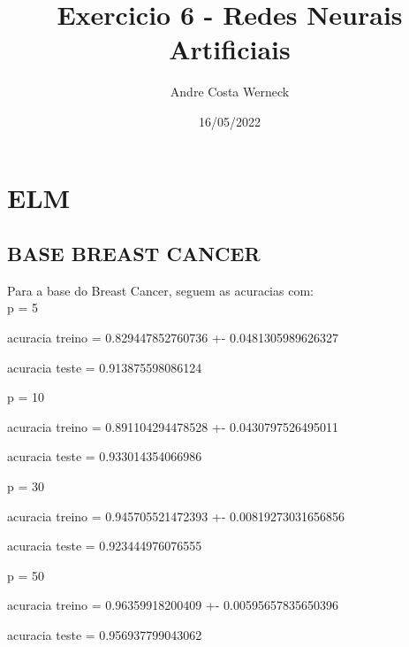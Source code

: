 \documentclass{article}
\begin{document}


\title{Exercicio 6 - Redes Neurais Artificiais}
\author{Andre Costa Werneck}
\date{16/05/2022}
\maketitle
\newpage






\section{ELM}
\subsection{BASE BREAST CANCER}

Para a base do Breast Cancer, seguem as acuracias com:
\\p = 5 

\begin{Schunk}
\begin{Soutput}
acuracia treino = 0.829447852760736 +- 0.0481305989626327
\end{Soutput}
\begin{Soutput}
acuracia teste = 0.913875598086124
\end{Soutput}
\end{Schunk}

p = 10 


\begin{Schunk}
\begin{Soutput}
acuracia treino = 0.891104294478528 +- 0.0430797526495011
\end{Soutput}
\begin{Soutput}
acuracia teste = 0.933014354066986
\end{Soutput}
\end{Schunk}

p = 30 


\begin{Schunk}
\begin{Soutput}
acuracia treino = 0.945705521472393 +- 0.00819273031656856
\end{Soutput}
\begin{Soutput}
acuracia teste = 0.923444976076555
\end{Soutput}
\end{Schunk}

p = 50 


\begin{Schunk}
\begin{Soutput}
acuracia treino = 0.96359918200409 +- 0.00595657835650396
\end{Soutput}
\begin{Soutput}
acuracia teste = 0.956937799043062
\end{Soutput}
\end{Schunk}
\end{document}
